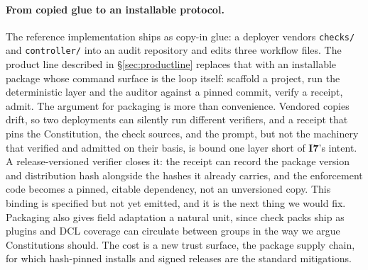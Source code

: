 \documentclass[11pt]{article}
\newcommand{\invariant}[1]{\textbf{I#1}}
\begin{document}
\paragraph{From copied glue to an installable protocol.} The reference implementation ships as copy-in glue: a deployer vendors \texttt{checks/} and \texttt{controller/} into an audit repository and edits three workflow files. The product line described in \S\ref{sec:productline} replaces that with an installable package whose command surface is the loop itself: scaffold a project, run the deterministic layer and the auditor against a pinned commit, verify a receipt, admit. The argument for packaging is more than convenience. Vendored copies drift, so two deployments can silently run different verifiers, and a receipt that pins the Constitution, the check sources, and the prompt, but not the machinery that verified and admitted on their basis, is bound one layer short of \invariant{7}'s intent. A release-versioned verifier closes it: the receipt can record the package version and distribution hash alongside the hashes it already carries, and the enforcement code becomes a pinned, citable dependency, not an unversioned copy. This binding is specified but not yet emitted, and it is the next thing we would fix. Packaging also gives field adaptation a natural unit, since check packs ship as plugins and DCL coverage can circulate between groups in the way we argue Constitutions should. The cost is a new trust surface, the package supply chain, for which hash-pinned installs and signed releases are the standard mitigations.
\end{document}
